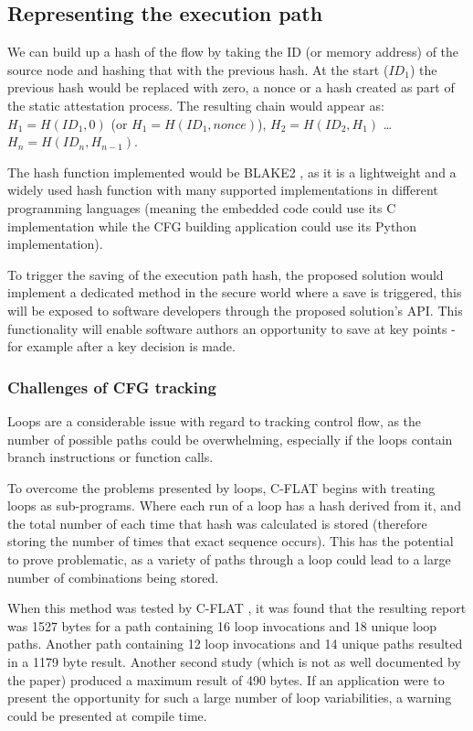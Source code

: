 \subsection{Representing the execution path}

We can build up a hash of the flow by taking the ID (or memory address) of the source node and hashing that with the previous hash. At the start ($ID_1$) the previous hash would be replaced with zero, a nonce or a hash created as part of the static attestation process. The resulting chain would appear as: 
$H_1 = H(ID_1,0)$ (or $H_1 = H(ID_1,nonce)$), $H_2 = H(ID_2,H_1)$ \ldots $H_n = H(ID_n,H_{n-1})$.

The hash function implemented would be BLAKE2 \cite{Aumasson2013}, as it is a lightweight and a widely used hash function with many supported implementations in different programming languages (meaning the embedded code could use its C implementation while the CFG building application could use its Python implementation).

To trigger the saving of the execution path hash, the proposed solution would implement a dedicated method in the secure world where a save is triggered, this will be exposed to software developers through the proposed solution's API. This functionality will enable software authors an opportunity to save at key points - for example after a key decision is made.

\subsubsection*{Challenges of CFG tracking}

Loops are a considerable issue with regard to tracking control flow, as the number of possible paths could be overwhelming, especially if the loops contain branch instructions or function calls.

To overcome the problems presented by loops, C-FLAT \cite{Abera2016} begins with treating loops as sub-programs. Where each run of a loop has a hash derived from it, and the total number of each time that hash was calculated is stored (therefore storing the number of times that exact sequence occurs). This has the potential to prove problematic, as a variety of paths through a loop could lead to a large number of combinations being stored. 

When this method was tested by C-FLAT \cite{Abera2016}, it was found that the resulting report was 1527 bytes for a path containing 16 loop invocations and 18 unique loop paths. Another path containing 12 loop invocations and 14 unique paths resulted in a 1179 byte result. Another second study (which is not as well documented by the paper) produced a maximum result of 490 bytes. If an application were to present the opportunity for such a large number of loop variabilities, a warning could be presented at compile time.


